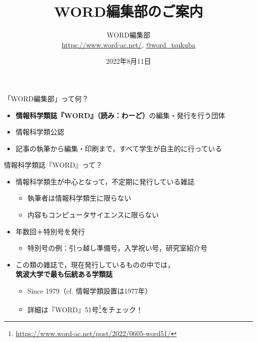 \documentclass[lualatex]{beamer}
\title{\textbf{WORD編集部のご案内}}
\author{WORD編集部\\\url{https://www.word-ac.net/}, \href{https://twitter.com/word\_tsukuba}{@word\_tsukuba}}
\date{2022年8月11日}   %
\begin{document}
\maketitle
\begin{frame}[plain]{「WORD編集部」って何？}
\begin{itemize}
 \item \alert{\textbf{情報科学類誌『WORD』（読み：わーど）}}の編集・発行を行う団体
 \item 情報科学類公認
 \item 記事の執筆から編集・印刷まで，すべて学生が自主的に行っている
\end{itemize}
\end{frame}
\begin{frame}[plain]{情報科学類誌『WORD』って？}
 \begin{itemize}
  \item 情報科学類生が中心となって，不定期に発行している雑誌
  \begin{itemize}
   \item 執筆者は情報科学類生に限らない
   \item 内容もコンピュータサイエンスに限らない
  \end{itemize}
  \item 年数回＋特別号を発行
  \begin{itemize}
   \item 特別号の例：引っ越し準備号，入学祝い号，研究室紹介号
  \end{itemize}
  \item \alert{この類の雑誌で，現在発行しているものの中では，\\\textbf{筑波大学で最も伝統ある学類誌}}
  \begin{itemize}
   \item Since 1979（cf. 情報学類設置は1977年）
   \item 詳細は『WORD』51号\footnote{\url{https://www.word-ac.net/post/2022/0605-word51/}}をチェック！
  \end{itemize}
 \end{itemize}
\end{frame}
\end{document}
